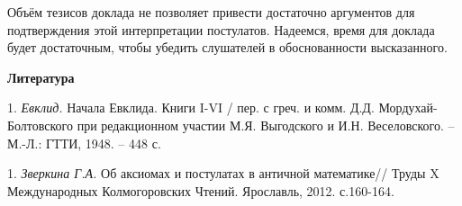 Объём тезисов доклада не позволяет привести достаточно аргументов для подтверждения этой интерпретации постулатов.
Надеемся, время для доклада будет достаточным, чтобы убедить слушателей в обоснованности высказанного.





\smallskip \centerline{\bf Литература}\nopagebreak

1. {\it Евклид.} Начала Евклида. Книги I-VI  / пер. с греч. и комм. Д.Д. Мордухай-Болтовского при редакционном
участии М.Я. Выгодского и И.Н. Веселовского. -- М.-Л.: ГТТИ, 1948. -- 448 с.

1. {\it Зверкина Г.А.} Об аксиомах и постулатах в античной математике// Труды X Международных Колмогоровских Чтений. Ярославль,
2012.  с.160-164.
